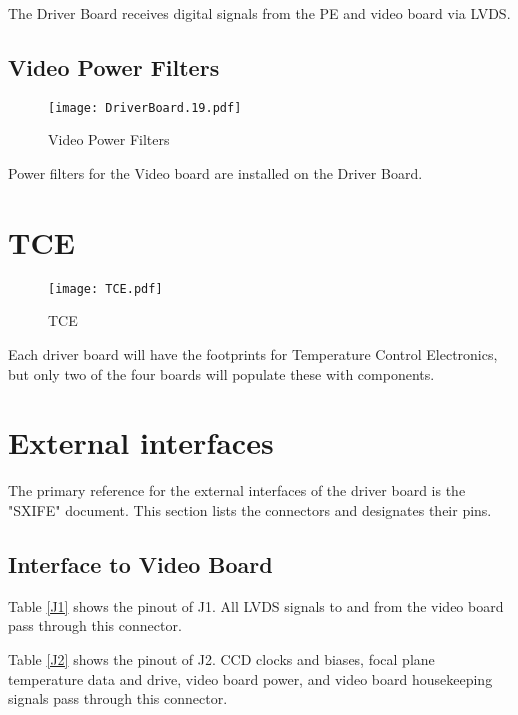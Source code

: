 \documentclass[a4paper,12pt]{article}
\begin{document}
The Driver Board receives digital signals from the PE and video board via LVDS.


\subsection{Video Power Filters}
   \begin{figure}
   \begin{center}
   \texttt{[image: DriverBoard.19.pdf]}
   \end{center}
   \caption{Video Power Filters}
   \end{figure}

Power filters for the Video board are installed on the Driver Board.

\section{TCE}

   \begin{figure}
   \begin{center}
   \texttt{[image: TCE.pdf]}
   \end{center}
   \caption{TCE}
   \end{figure}


Each driver board will have the footprints for Temperature Control Electronics, but only two of the four boards will populate these with components.

\section{External interfaces}

The primary reference for the external interfaces of the driver board is the "SXIFE" document. This section lists the connectors and designates their pins.

\subsection{Interface to Video Board}

Table \ref{J1} shows the pinout of J1. All LVDS signals to and from the video board pass through this connector.

Table \ref{J2} shows the pinout of J2. CCD clocks and biases, focal plane temperature data and drive, video board power, and video board housekeeping signals pass through this connector.
\end{document}
